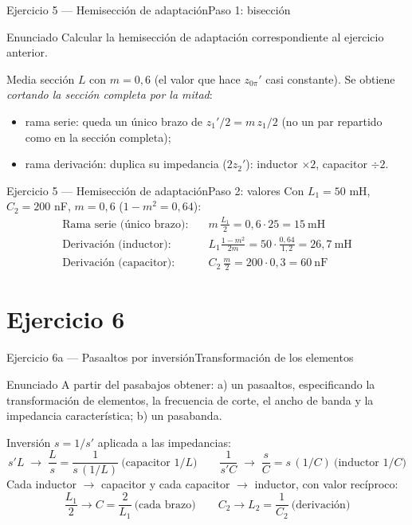 \documentclass[10pt, aspectratio=169]{beamer}
\newcommand{\figura}[2][0.92\textwidth]{%
  \begin{center}
    \adjustbox{max width=#1, max totalheight=0.55\textheight}{}%
  \end{center}}
\begin{document}
\begin{frame}{Ejercicio 5 --- Hemisección de adaptación}{Paso 1: bisección}
  \begin{block}{Enunciado}
    Calcular la hemisección de adaptación correspondiente al ejercicio anterior.
  \end{block}
  \vspace{1ex}
  Media sección $L$ con $m=0{,}6$ (el valor que hace $z_{0\pi}'$ casi constante).
  Se obtiene \emph{cortando la sección completa por la mitad}:
  \begin{itemize}\setlength{\itemsep}{1.5ex}
    \item rama serie: queda un \alert{único brazo} de $z_1'/2 = m\,z_1/2$
          (no un par repartido como en la sección completa);
    \item rama derivación: \alert{duplica} su impedancia ($2z_2'$):
          inductor $\times 2$, capacitor $\div 2$.
  \end{itemize}
\end{frame}

\begin{frame}{Ejercicio 5 --- Hemisección de adaptación}{Paso 2: valores}
  Con $L_1 = 50$ mH, $C_2 = 200$ nF, $m = 0{,}6$ ($1-m^2 = 0{,}64$):
  \[
  \begin{aligned}
      \text{Rama serie (único brazo):}\quad & m\,\frac{L_1}{2} = 0{,}6\cdot 25 = \boxed{15\ \text{mH}}\\[0.4ex]
      \text{Derivación (inductor):}\quad & L_1\frac{1-m^2}{2m} = 50\cdot\frac{0{,}64}{1{,}2} = \boxed{26{,}7\ \text{mH}}\\[0.4ex]
      \text{Derivación (capacitor):}\quad & C_2\,\frac{m}{2} = 200\cdot 0{,}3 = \boxed{60\ \text{nF}}
  \end{aligned}
  \]
  \figura[0.48\textwidth]{figures/fig_ej05_hemi_pb}
\end{frame}

\section{Ejercicio 6}

\begin{frame}{Ejercicio 6a --- Pasaaltos por inversión}{Transformación de los elementos}
  \begin{block}{Enunciado}
    A partir del pasabajos obtener: a) un pasaaltos, especificando la transformación
    de elementos, la frecuencia de corte, el ancho de banda y la impedancia
    característica; b) un pasabanda.
  \end{block}
  \vspace{1ex}
  Inversión $s = 1/s'$ aplicada a las impedancias:
  \[
      s'L \;\longrightarrow\; \frac{L}{s} = \frac{1}{s\,(1/L)}\ \text{(capacitor } 1/L\text{)}
      \qquad
      \frac{1}{s'C} \;\longrightarrow\; \frac{s}{C} = s\,(1/C)\ \text{(inductor } 1/C\text{)}
  \]
  Cada inductor $\to$ capacitor y cada capacitor $\to$ inductor, con valor recíproco:
  \[
      \frac{L_1}{2} \longrightarrow C = \frac{2}{L_1}\ \text{(cada brazo)}
      \qquad
      C_2 \longrightarrow L_2 = \frac{1}{C_2}\ \text{(derivación)}
  \]
\end{frame}
\end{document}
